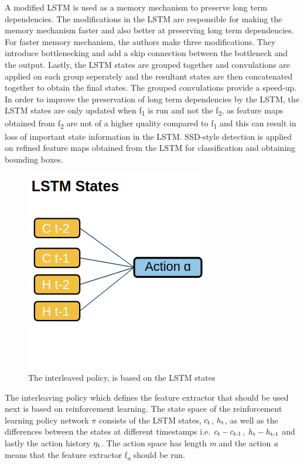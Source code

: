 \documentclass[conference]{IEEEtran}
\begin{document}
A modified LSTM \cite{b18} is used as a memory mechanism to preserve long term dependencies. The modifications in the LSTM are responsible for making the memory mechanism faster and also better at preserving long term dependencies. For faster memory mechanism, the authors make three modifications. They introduce bottlenecking and add a skip connection between the bottleneck and the output. Lastly, the LSTM states are grouped together and convulations are applied on each group seperately and the resultant states are then concatenated together to obtain the final states. The grouped convulations provide a speed-up. In order to improve the preservation of long term dependencies by the LSTM, the LSTM states are only updated when f\textsubscript{1} is run and not the f\textsubscript{2}, as feature maps obtained from f\textsubscript{2} are not of a higher quality compared to f\textsubscript{1} and this can result in loss of important state information in the LSTM. \newline
SSD-style \cite{b17} detection is applied on refined feature maps obtained from the LSTM for classification and obtaining bounding boxes. \newline

\begin{figure}[h]
\centering
\includegraphics[width=0.33\columnwidth]{interleaved-policy}
\caption{The interleaved policy, is based on the LSTM states}
\end{figure}

The interleaving policy which defines the feature extractor that should be used next is based on reinforcement learning. The state space of the reinforcement learning policy network $\pi$ consists of the LSTM states, $c\textsubscript{t}$, $h\textsubscript{t}$, as well as the differences between the states at different timestamps i.e. $c\textsubscript{t}-c\textsubscript{t-1}$, $h\textsubscript{t}-h\textsubscript{t-1}$ and lastly the action history $\eta\textsubscript{t}$. The action space has length \textit{m} and the action \textit{a} means that the feature extractor f\textsubscript{\textit{a}} should be run. \newline
\end{document}
